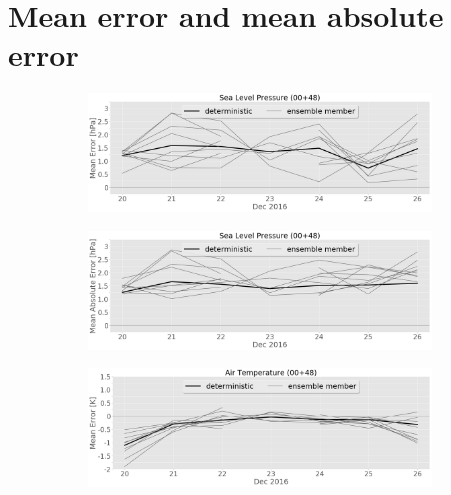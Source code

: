 
\section{Mean error and mean absolute error}%
\label{app:mean_error}

\begin{figure}[h]%
		\centering
		\begin{subfigure}[b]{0.49\textwidth}
			\includegraphics[width=\textwidth]{./fig_sfc_pressure/ME_20161220_26_00}
			\caption{}\label{fig:bias:pres}
		\end{subfigure}
        \begin{subfigure}[b]{0.49\textwidth}
			\includegraphics[width=\textwidth]{./fig_sfc_pressure/MAE_20161220_26_00}
			\caption{}\label{fig:MAE:pres}
		\end{subfigure}
		\begin{subfigure}[b]{0.49\textwidth}
			\includegraphics[width=\textwidth]{./fig_sfc_temp/ME_20161220_26_00}
			\caption{}\label{fig:bias:temp}

\end{subfigure}
\end{figure}
